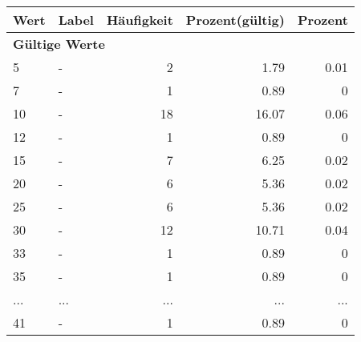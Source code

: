      \begin{longtable}{lXrrr}
     \toprule
     \textbf{Wert} & \textbf{Label} & \textbf{Häufigkeit} & \textbf{Prozent(gültig)} & \textbf{Prozent} \\
     \endhead
     \midrule
     \multicolumn{5}{l}{\textbf{Gültige Werte}}\\
        5 & \multicolumn{1}{X}{-} & %
          \num{2} &
          \num[round-mode=places,round-precision=2]{1.79} &
          \num[round-mode=places,round-precision=2]{0.01} \\
        7 & \multicolumn{1}{X}{-} & %
          \num{1} &
          \num[round-mode=places,round-precision=2]{0.89} &
          \num[round-mode=places,round-precision=2]{0} \\
        10 & \multicolumn{1}{X}{-} & %
          \num{18} &
          \num[round-mode=places,round-precision=2]{16.07} &
          \num[round-mode=places,round-precision=2]{0.06} \\
        12 & \multicolumn{1}{X}{-} & %
          \num{1} &
          \num[round-mode=places,round-precision=2]{0.89} &
          \num[round-mode=places,round-precision=2]{0} \\
        15 & \multicolumn{1}{X}{-} & %
          \num{7} &
          \num[round-mode=places,round-precision=2]{6.25} &
          \num[round-mode=places,round-precision=2]{0.02} \\
        20 & \multicolumn{1}{X}{-} & %
          \num{6} &
          \num[round-mode=places,round-precision=2]{5.36} &
          \num[round-mode=places,round-precision=2]{0.02} \\
        25 & \multicolumn{1}{X}{-} & %
          \num{6} &
          \num[round-mode=places,round-precision=2]{5.36} &
          \num[round-mode=places,round-precision=2]{0.02} \\
        30 & \multicolumn{1}{X}{-} & %
          \num{12} &
          \num[round-mode=places,round-precision=2]{10.71} &
          \num[round-mode=places,round-precision=2]{0.04} \\
        33 & \multicolumn{1}{X}{-} & %
          \num{1} &
          \num[round-mode=places,round-precision=2]{0.89} &
          \num[round-mode=places,round-precision=2]{0} \\
        35 & \multicolumn{1}{X}{-} & %
          \num{1} &
          \num[round-mode=places,round-precision=2]{0.89} &
          \num[round-mode=places,round-precision=2]{0} \\
       ... & ... & ... & ... & ... \\
        41 & \multicolumn{1}{X}{-} & %
          \num{1} &
          \num[round-mode=places,round-precision=2]{0.89} &
          \num[round-mode=places,round-precision=2]{0} \\


\end{longtable}
